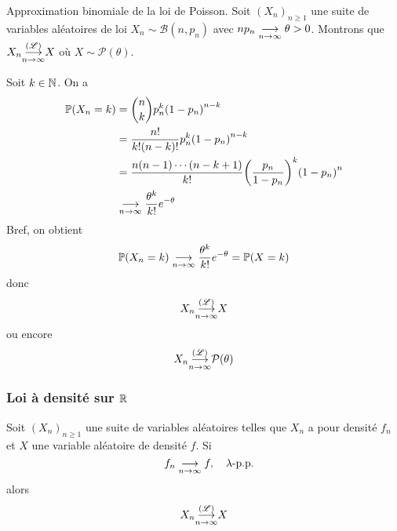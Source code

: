 \begin{example}
    Approximation binomiale de la loi de Poisson. Soit \({(X_n)}_{n\geq 1}\)
    une suite de variables aléatoires de loi \(X_n\sim\mathcal B(n,p_n)\) avec
    \(n p_n\underset{n\to\infty}{\longrightarrow} \theta>0\). Montrons que \(X_n \underset{n\to\infty}{{\overset{(\mathscr{L})}{\longrightarrow}}} X\) où \(X\sim\mathcal P(\theta)\).

    Soit \(k\in\mathbb{N}\). On a
    \begin{equation*}
        \begin{aligned}
            \mathbb{P}(X_n = k)
            &= \binom{n}{k} p_n^k {(1-p_n)}^{n-k}\\
            &= \frac{n!}{k!(n-k)!} p_n^k {(1-p_n)}^{n-k}\\
            &= \frac{n(n-1)\cdots(n-k+1)}{k!} {\left(\frac{p_n}{1-p_n}\right)}^k {(1-p_n)}^n\\
            &\underset{n\to\infty}{\longrightarrow} \frac{\theta^k}{k!} e^{-\theta}
        \end{aligned}
    \end{equation*}
    Bref, on obtient
    \begin{equation*}
        \mathbb{P}(X_n = k) \underset{n\to\infty}{\longrightarrow} \frac{\theta^k}{k!} e^{-\theta}= \mathbb{P}(X = k)
    \end{equation*}
    donc
    \begin{equation*}
        X_n \underset{n\to\infty}{{\overset{(\mathscr{L})}{\longrightarrow}}} X
    \end{equation*}
    ou encore
    \begin{equation*}
        X_n \underset{n\to\infty}{{\overset{(\mathscr{L})}{\longrightarrow}}} \mathcal P(\theta)
    \end{equation*}
\end{example}

\subsubsection{Loi à densité sur \(\mathbb{R}\)}

\begin{proposition}
    Soit \({(X_n)}_{n\geq 1}\) une suite de variables aléatoires
    telles que \(X_n\) a pour densité \(f_n\) et \(X\) 
    une variable aléatoire de densité \(f\). Si
    \begin{equation*}
        \quad f_n \underset{n\to\infty}{\longrightarrow} f,\quad \lambda\text{-p.p.}
    \end{equation*}
    alors
    \begin{equation*}
        X_n \underset{n\to\infty}{{\overset{(\mathscr{L})}{\longrightarrow}}} X
    \end{equation*}
\end{proposition}


